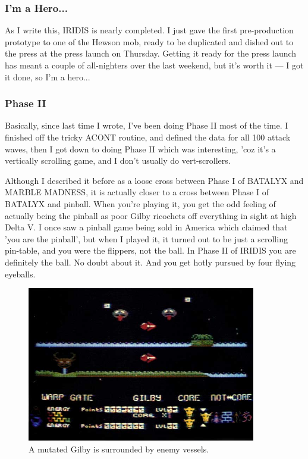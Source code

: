 \subsubsection{I'm a Hero...}
As I write this, IRIDIS is nearly completed. I just gave the first pre-production prototype to one of the Hewson mob, ready to be duplicated and dished out to the press at the press launch on Thursday. Getting it ready for the press launch has meant a couple of all-nighters over the last weekend, but it's worth it — I got it done, so I'm a hero...

\subsubsection{Phase II}
Basically, since last time I wrote, I've been doing Phase II most of the time. I finished off the tricky ACONT routine, and defined the data for all 100 attack waves, then I got down to doing Phase II which was interesting, 'coz it's a vertically scrolling game, and I don't usually do vert-scrollers.

Although I described it before as a loose cross between Phase I of BATALYX and MARBLE MADNESS, it is actually closer to a cross between Phase I of BATALYX and pinball. When you're playing it, you get the odd feeling of actually being the pinball as poor Gilby ricochets off everything in sight at high Delta V. I once saw a pinball game being sold in America which claimed that 'you are the pinball', but when I played it, it turned out to be just a scrolling pin-table, and you were the flippers, not the ball. In Phase II of IRIDIS you are definitely the ball. No doubt about it. And you get hotly pursued by four flying eyeballs.

\begin{figure}[H]
    \centering
      \includegraphics[width=10cm]{src/diary/zzap17_pic1.jpg}%
\caption{
A mutated Gilby is surrounded by enemy vessels.
}
\end{figure}


